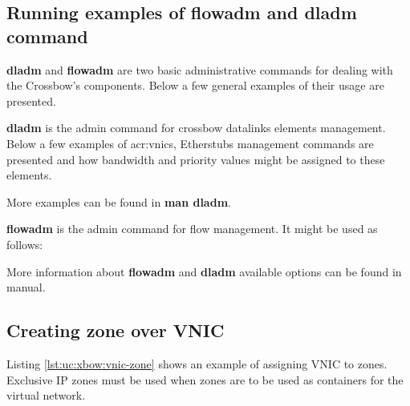 \documentclass[11pt]{book}
\begin{document}
      \subsection{Running examples of flowadm and dladm command}

        \textbf{dladm} and \textbf{flowadm} are two basic administrative commands for dealing with the Crossbow's
        components. Below a few general examples of their usage are presented.
  
        \textbf{dladm} is the admin command for crossbow datalinks elements management. Below a few examples of \gls{acr:vnic}s,
        Etherstubs management commands are presented and how bandwidth and priority values might be assigned to these
        elements.

	\medskip

        \noindent
        \begin{minipage}{\textwidth}
          
        \end{minipage}
  
        More examples can be found in \textbf{man dladm}.

        \medskip

        \textbf{flowadm} is the admin command for flow management. It might be used as follows:     

	\medskip

        \noindent
        \begin{minipage}{\textwidth}
          
        \end{minipage}

        More information about \textbf{flowadm} and \textbf{dladm} available options can be found in manual.

      \subsection{Creating zone over VNIC}

	Listing \ref{lst:uc:xbow:vnic-zone} shows an example of assigning VNIC to zones. Exclusive IP zones must be 
	used when zones are to be used as containers for the virtual network. 

	\medskip

       \noindent
        \begin{minipage}{\textwidth}
          
        \end{minipage}
\end{document}
